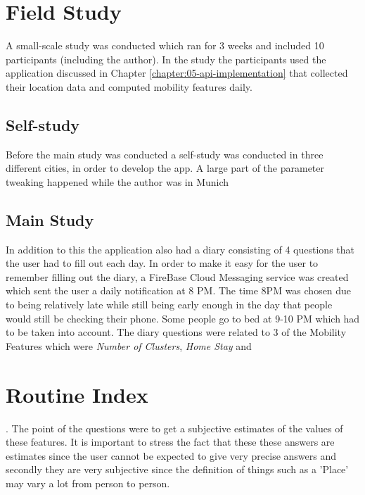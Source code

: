 \section{Field Study}
A small-scale study was conducted which ran for 3 weeks and included 10 participants (including the author). In the study the participants used the application discussed in Chapter \ref{chapter:05-api-implementation} that collected their location data and computed mobility features daily.


\subsection{Self-study}
Before the main study was conducted a self-study was conducted in three different cities, in order to develop the app. A large part of the parameter tweaking happened while the author was in Munich 

\subsection{Main Study}
 In addition to this the application also had a diary consisting of 4 questions that the user had to fill out each day. In order to make it easy for the user to remember filling out the diary, a FireBase Cloud Messaging service was created which sent the user a daily notification at 8 PM. The time 8PM was chosen due to being relatively late while still being early enough in the day that people would still be checking their phone. Some people go to bed at 9-10 PM which had to be taken into account. The diary questions were related to 3 of the Mobility Features which were \textit{Number of Clusters}, \textit{Home Stay} and \section{Routine Index}. The point of the questions were to get a subjective estimates of the values of these features. It is important to stress the fact that these these answers are estimates since the user cannot be expected to give very precise answers and secondly they are very subjective since the definition of things such as a 'Place' may vary a lot from person to person.


